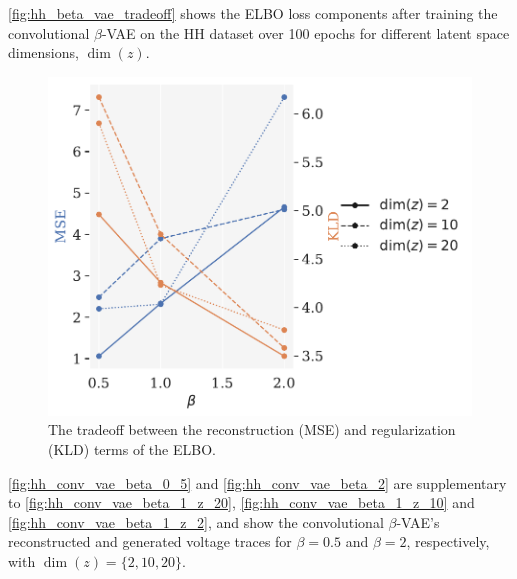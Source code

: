 \autoref{fig:hh_beta_vae_tradeoff} shows the ELBO loss components after training the convolutional $\beta$-VAE on the HH dataset over 100 epochs for different latent space dimensions, $\dim(z)$. 

\begin{figure}[!htb]
\begin{center}\includegraphics[scale=0.75]{latex/figures/hh_mse_kld_vs_beta_conv_vae.pdf}
\end{center}
\caption{The tradeoff between the reconstruction (MSE) and regularization (KLD) terms of the ELBO.}
\label{fig:hh_beta_vae_tradeoff}
\end{figure}

\autoref{fig:hh_conv_vae_beta_0_5} and \autoref{fig:hh_conv_vae_beta_2} are supplementary to \autoref{fig:hh_conv_vae_beta_1_z_20}, \ref{fig:hh_conv_vae_beta_1_z_10} and \ref{fig:hh_conv_vae_beta_1_z_2}, and show the convolutional $\beta$-VAE's reconstructed and generated voltage traces for $\beta = 0.5$ and $\beta=2$, respectively, with $\dim (z) = \{2, 10, 20\}$.

